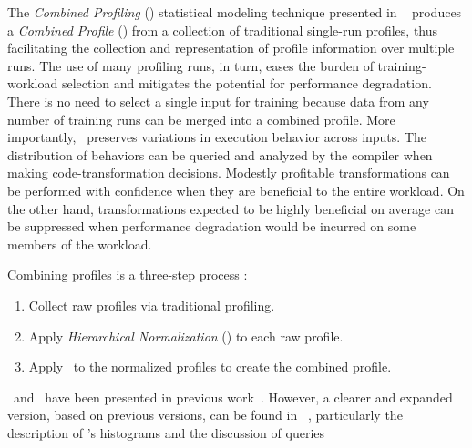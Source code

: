The {\em Combined Profiling} (\CP) statistical modeling technique
presented in ~\cite{BerubePhD} produces a {\it Combined Profile} (\CProf)
from a collection of traditional single-run profiles, thus
facilitating the collection and representation of profile information
over multiple runs. The use of many profiling runs, in turn, eases the
burden of training-workload selection and mitigates the potential for
performance degradation.  There is no need to select a single input
for training because data from any number of training runs can be
merged into a combined profile.  More importantly, \CP\ preserves
variations in execution behavior across inputs.  The distribution of
behaviors can be queried and analyzed by the compiler when making
code-transformation decisions.  Modestly profitable transformations
can be performed with confidence when they are beneficial to the
entire workload. On the other hand, transformations expected to be
highly beneficial on average can be suppressed when performance
degradation would be incurred on some members of the workload.

Combining profiles is a three-step process \cite{BerubeISPASS12}:
\begin{enumerate}
\item Collect raw profiles via traditional profiling.
\item Apply {\em Hierarchical Normalization} (\HN) to each raw profile. 
\item Apply \CP\ to the normalized profiles to create the combined profile.
\end{enumerate}


\CP\ and \HN\ have been presented in previous 
work~\cite{BerubeICPE11,BerubeISPASS12}. %
However, a clearer and expanded version, based on previous versions, can
be found in ~\cite{BerubePhD}, particularly the
description of \CP's histograms and the discussion of queries

